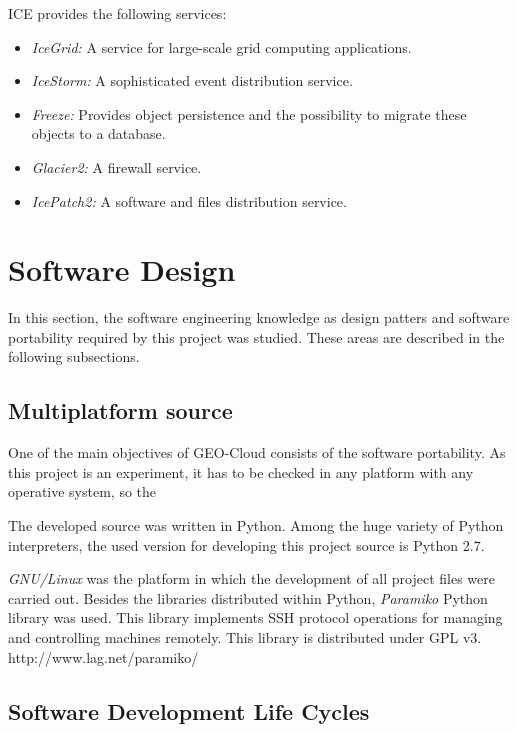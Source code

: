 \ac{ICE} provides the following services:
\begin{itemize}
\item \emph{IceGrid:} A service for large-scale grid computing applications. 
\item \emph{IceStorm:} A sophisticated event distribution service.
\item \emph{Freeze:} Provides object persistence and the possibility to migrate
  these objects to a database.
\item \emph{Glacier2:} A firewall service.
\item \emph{IcePatch2:} A software and files distribution service.
\end{itemize} 

\section{Software Design}

In this section, the software engineering knowledge as design patters and
software portability required by this project was studied. These areas are
described in the following subsections.

\subsection{Multiplatform source}

One of the main objectives of GEO-Cloud consists of the software portability. As
this project is an experiment, it has to be checked in any platform with any
operative system, so the   

The developed source was written in Python. Among the huge variety of Python
interpreters, the used version for developing this project source is Python 2.7.

\emph{GNU/Linux} was the platform in which the development of all project files were
carried out. Besides the libraries distributed within Python, \emph{Paramiko}
Python library was used. This library implements \ac{SSH} protocol operations
for managing and controlling machines remotely. This library is distributed
under \ac{GPL} v3.
http://www.lag.net/paramiko/  

\subsection{Software Development Life Cycles}

